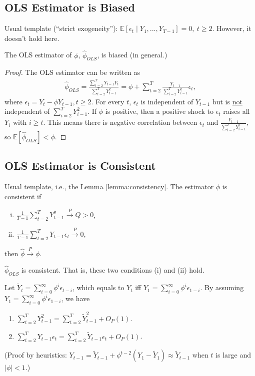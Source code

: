 \documentclass[11pt]{elegantbook}
\begin{document}
\subsection{OLS Estimator is Biased}
Usual template (``strict exogeneity''): $\mathbb{E}[\epsilon_t\mid Y_1,...,Y_{T-1}]=0,\ t\geq 2$. However, it doesn't hold here.
\begin{claim}
    The OLS estimator of $\phi$, $\hat{\phi}_{OLS}$, is biased (in general.)
\end{claim}
\begin{proof}
    The OLS estimator can be written as
    \begin{equation}
        \begin{aligned}
            \hat{\phi}_{OLS}=\frac{\sum_{t=2}^TY_{t-1}Y_t}{\sum_{t=2}^T Y_{t-1}^2}=\phi+\sum_{t=2}^T\frac{Y_{t-1}}{\sum_{i=2}^T Y_{i-1}^2}\epsilon_t,
        \end{aligned}
        \nonumber
    \end{equation}
    where $\epsilon_t=Y_t-\phi Y_{t-1}, t\geq 2$. For every $t$, $\epsilon_t$ is independent of $Y_{t-1}$ but is \underline{not} independent of $\sum_{i=2}^T Y_{i-1}^2$. If $\phi$ is positive, then a positive shock to $\epsilon_t$ raises all $Y_i$ with $i\geq t$. This means there is negative correlation between $\epsilon_t$ and $\frac{Y_{t-1}}{\sum_{i=2}^T Y_{i-1}^2}$, so $\mathbb{E}[\hat{\phi}_{OLS}]<\phi$.
\end{proof}

\subsection{OLS Estimator is Consistent}
Usual template, i.e., the Lemma \ref{lemma:consistency}. The estimator $\hat{\phi}$ is consistent if
\begin{enumerate}[(i).]
    \item $\frac{1}{T-1}\sum_{t=2}^T Y_{t-1}^2 \stackrel{P}{\longrightarrow} Q>0$,
    \item $\frac{1}{T-1}\sum_{t=2}^T Y_{t-1}\epsilon_t \stackrel{P}{\longrightarrow} 0$,
\end{enumerate}
then $\hat{\phi}\stackrel{P}{\longrightarrow} \phi$.
\begin{claim}
    $\hat{\phi}_{OLS}$ is consistent. That is, these two conditions (i) and (ii) hold.
\end{claim}
Let $\tilde{Y}_t=\sum_{i=0}^\infty \phi^i\epsilon_{t-i}$, which equals to $Y_t$ iff $Y_1=\sum_{i=0}^\infty \phi^i\epsilon_{1-i}$. By assuming $Y_1=\sum_{i=0}^\infty \phi^i\epsilon_{1-i}$, we have
\begin{enumerate}
    \item $\sum_{t=2}^T Y_{t-1}^2=\sum_{t=2}^T \tilde{Y}_{t-1}^2+ O_P(1)$.
    \item $\sum_{t=2}^T Y_{t-1}\epsilon_t=\sum_{t=2}^T \tilde{Y}_{t-1}\epsilon_t+ O_P(1)$.
\end{enumerate}
(Proof by heuristics: $Y_{t-1}=\tilde{Y}_{t-1}+\phi^{t-2}(Y_1-\tilde{Y}_1)\approx \tilde{Y}_{t-1}$ when $t$ is large and $|\phi|<1$.)
\end{document}
